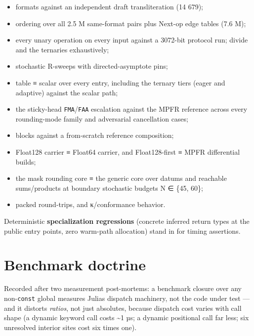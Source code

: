 \begin{itemize}
\item formats against an independent draft transliteration (14 679);


\item ordering over all 2.5 M same-format pairs plus Next-op edge tables (7.6 M);


\item every unary operation on every input against a 3072-bit protocol run; divide and the ternaries exhaustively;


\item stochastic R-sweeps with directed-asymptote pins;


\item table ≡ scalar over every entry, including the ternary tiers (eager and adaptive) against the scalar path;


\item the sticky-head \texttt{FMA}/\texttt{FAA} escalation against the MPFR reference across every rounding-mode family and adversarial cancellation cases;


\item blocks against a from-scratch reference composition;


\item Float128 carrier ≡ Float64 carrier, and Float128-first ≡ MPFR differential builds;


\item the mask rounding core ≡ the generic core over datums and reachable sums/products at boundary stochastic budgets N ∈ \{45, 60\};


\item packed round-trips, and κ/conformance behavior.

\end{itemize}


Deterministic \textbf{specialization regressions} (concrete inferred return types at the public entry points, zero warm-path allocation) stand in for timing assertions.



\section{Benchmark doctrine}



\label{14987590650541321188}{}


Recorded after two measurement post-mortems: a benchmark closure over any non-\texttt{const} global measures Julia{\textquotesingle}s dispatch machinery, not the code under test — and it distorts \emph{ratios}, not just absolutes, because dispatch cost varies with call shape (a dynamic keyword call costs {\textasciitilde}1 µs; a dynamic positional call far less; six unresolved interior sites cost six times one).



